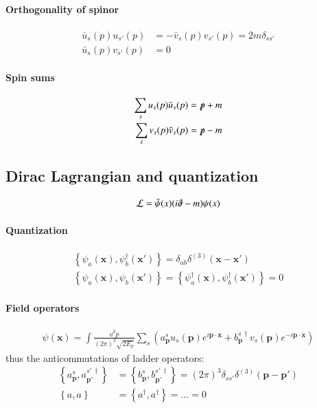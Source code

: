 \documentclass{scrartcl}
\newcommand{\lag}{\mathcal{L}}
\numberwithin{equation}{section}
\begin{document}
\paragraph{Orthogonality of spinor}
\begin{align}
	\bar{u}_s(p) u_{s'}(p) &= -\bar{v}_s(p) v_{s'}(p) = 2m \delta_{ss'} \\
	\bar{u}_s(p) v_{s'}(p) &= 0
\end{align}
\paragraph{Spin sums}
\begin{align}
	\sum_{s} u_s(p)\bar{u}_s(p) &= \slashed{p} + m  \\
	\sum_{s} v_s(p)\bar{v}_s(p) &= \slashed{p} - m 
\end{align}

\subsection{Dirac Lagrangian and quantization}
\begin{align}
	\lag = \bar{\psi}(x) (i\slashed{\partial} - m) \psi(x)
\end{align}
\paragraph{Quantization}
\begin{align}
	\left\{ \psi_a(\pmb{x}), \psi_b^\dagger(\pmb{x}') \right\} = \delta_{ab}\delta^{(3)}(\pmb{x}-\pmb{x}') \\
	\left\{ \psi_a(\pmb{x}), \psi_b(\pmb{x}') \right\} = \left\{ \psi^\dagger_a(\pmb{x}), \psi^\dagger_b(\pmb{x}') \right\} = 0
\end{align}
\paragraph{Field operators}
\begin{align}
\psi(\pmb{x}) = \int \frac{\dd^3 p}{(2\pi)^3 \sqrt{2E_p}} \sum_s (a_{\pmb{p}}^s u_s(\pmb{p})e^{i\pmb{p}\cdot\pmb{x}} + b_{\pmb{p}}^{s\,\dagger} v_s(\pmb{p})e^{-i\pmb{p}\cdot\pmb{x}})
\end{align}
thus the anticommutations of ladder operators:
\begin{align*}
	\left\{ a_{\pmb{p}}^s, a_{\pmb{p'}}^{s'\,\dagger} \right\} &= \left\{ b_{\pmb{p}}^s, b_{\pmb{p'}}^{s'\,\dagger} \right\}= (2\pi)^3\delta_{ss'}\delta^{(3)}(\pmb{p}-\pmb{p}') \\
	\left\{ a, a \right\} &= \left\{ a^\dagger, a^\dagger \right\} = \dots = 0
\end{align*}
\end{document}
